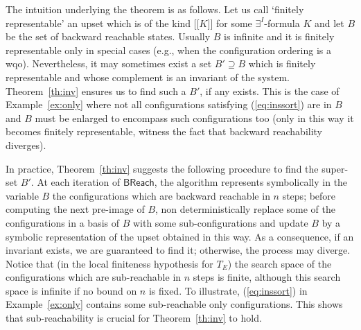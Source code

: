 \documentclass{LMCS}
\newcommand{\mywidehat}[1]{\ensuremath{\lbrack\!\lbrack #1 \rbrack\!\rbrack}}
\theoremstyle{plain}\newtheorem{assumption}[thm]{Assumption}
\theoremstyle{plain}\newtheorem{proposition}[thm]{Proposition}
\theoremstyle{plain}\newtheorem{property}[thm]{Property}
\theoremstyle{plain}\newtheorem{example}[thm]{Example}
\theoremstyle{plain}\newtheorem{claim}[thm]{Claim}
\theoremstyle{plain}\newtheorem{lemma}[thm]{Lemma}
\begin{document}
The intuition underlying the theorem is as follows. Let us call
`finitely representable' an upset which is of the kind $\mywidehat{K}$
for some $\exists^I$-formula $K$ and let $B$ be the set of backward
reachable states.  Usually $B$ is infinite and it is finitely
representable only in special cases (e.g., when the configuration
ordering is a wqo).  Nevertheless, it may sometimes exist a set
$B'\supseteq B$ which is finitely representable and whose complement
is an invariant of the system.  Theorem~\ref{th:inv} ensures us to
find such a $B'$, if any exists.  This is the case of
Example~\ref{ex:only} where not all configurations satisfying
(\ref{eq:inssort}) are in $B$ and $B$ must be enlarged to
encompass such configurations too (only in this way it becomes
finitely representable, witness the fact that backward reachability
diverges).

In practice, Theorem~\ref{th:inv} suggests the following procedure to
find the super-set $B'$.  At each iteration of $\mathsf{BReach}$, the
algorithm represents symbolically in the variable $B$ the
configurations which are backward reachable in $n$ steps; before
computing the next pre-image of $B$, non deterministically replace
some of the configurations in a basis of $B$ with some
sub-configurations and update $B$ by a symbolic representation of the
upset obtained in this way.  As a consequence, if an invariant exists,
we are guaranteed to find it; otherwise, the process may diverge.
Notice that (in the local finiteness hypothesis for $T_E$) the search
space of the configurations which are sub-reachable in $n$ steps is
finite, although this search space is infinite if no bound on $n$ is
fixed.  To illustrate,
(\ref{eq:inssort}) in
Example~\ref{ex:only} contains some sub-reachable only configurations.
This shows that sub-reachability is crucial for Theorem~\ref{th:inv}
to hold.
\end{document}

